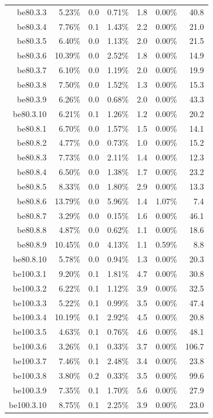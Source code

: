 \documentclass[pdflatex,sn-mathphys-num]{sn-jnl}%
\theoremstyle{thmstyleone}%
\theoremstyle{thmstyletwo}%
\theoremstyle{thmstylethree}%
\begin{document}
\begin{table}[h!]
{\begin{tabular}{rrrrrrr}
		be80.3.3 &5.23\% &0.0 &0.71\% &1.8 &0.00\% &40.8  \\
		be80.3.4 &7.76\% &0.1 &1.43\% &2.2 &0.00\% &21.0  \\
		be80.3.5 &6.40\% &0.0 &1.13\% &2.0 &0.00\% &21.5  \\
		be80.3.6 &10.39\% &0.0 &2.52\% &1.8 &0.00\% &14.9  \\
		be80.3.7 &6.10\% &0.0 &1.19\% &2.0 &0.00\% &19.9  \\
		be80.3.8 &7.50\% &0.0 &1.52\% &1.3 &0.00\% &15.3  \\
		be80.3.9 &6.26\% &0.0 &0.68\% &2.0 &0.00\% &43.3  \\
		be80.3.10 &6.21\% &0.1 &1.26\% &1.2 &0.00\% &20.2  \\
		be80.8.1 &6.70\% &0.0 &1.57\% &1.5 &0.00\% &14.1  \\
		be80.8.2 &4.77\% &0.0 &0.73\% &1.0 &0.00\% &15.2  \\
		be80.8.3 &7.73\% &0.0 &2.11\% &1.4 &0.00\% &12.3  \\
		be80.8.4 &6.50\% &0.0 &1.38\% &1.7 &0.00\% &23.2  \\
		be80.8.5 &8.33\% &0.0 &1.80\% &2.9 &0.00\% &13.3  \\
		be80.8.6 &13.79\% &0.0 &5.96\% &1.4 &1.07\% &7.4  \\
		be80.8.7 &3.29\% &0.0 &0.15\% &1.6 &0.00\% &46.1  \\
		be80.8.8 &4.87\% &0.0 &0.62\% &1.1 &0.00\% &18.6  \\
		be80.8.9 &10.45\% &0.0 &4.13\% &1.1 &0.59\% &8.8  \\
		be80.8.10 &5.78\% &0.0 &0.94\% &1.3 &0.00\% &20.3  \\
		be100.3.1 &9.20\% &0.1 &1.81\% &4.7 &0.00\% &30.8  \\
		be100.3.2 &6.22\% &0.1 &1.12\% &3.9 &0.00\% &32.5  \\
		be100.3.3 &5.22\% &0.1 &0.99\% &3.5 &0.00\% &47.4  \\
		be100.3.4 &10.19\% &0.1 &2.92\% &4.5 &0.00\% &20.8  \\
		be100.3.5 &4.63\% &0.1 &0.76\% &4.6 &0.00\% &48.1  \\
		be100.3.6 &3.26\% &0.1 &0.33\% &3.7 &0.00\% &106.7  \\
		be100.3.7 &7.46\% &0.1 &2.48\% &3.4 &0.00\% &23.8  \\
		be100.3.8 &3.80\% &0.2 &0.33\% &3.5 &0.00\% &99.6  \\
		be100.3.9 &7.35\% &0.1 &1.70\% &5.6 &0.00\% &27.9  \\
		be100.3.10 &8.75\% &0.1 &2.25\% &3.9 &0.00\% &23.0  \\

\end{tabular}}
\end{table}
\end{document}
